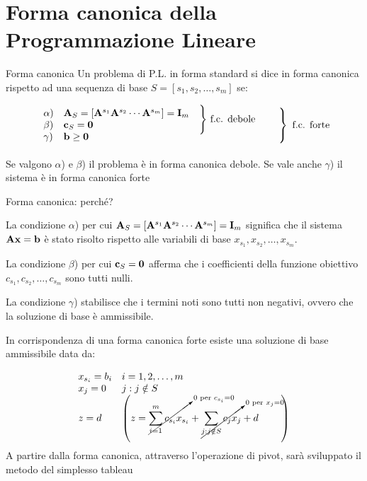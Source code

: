 \documentclass{beamer}
\begin{document}
\section{Forma canonica della Programmazione Lineare}

\begin{frame}{Forma canonica}
Un problema di P.L. in forma standard si dice in forma canonica rispetto ad una sequenza di base  $S = [s_1, s_2, \ldots, s_m]$ se:


\[\begin{array}{ll}
\alpha) & \mathbf{A}_S = [\mathbf{A}^{s_1} \mathbf{A}^{s_2} \cdots \mathbf{A}^{s_m}] = \mathbf{I}_m \\
\beta) & \mathbf{c}_S = \mathbf{0} \\
\gamma) & \mathbf{b} \geq \mathbf{0}
\end{array}
\begin{array}{ll}
\Bigg\} \text{ f.c. debole}\\
\phantom{x}
\end{array}
\left.\begin{array}{ll}
\phantom{x}\\
\phantom{x}\\
\phantom{x}\\
\end{array}
\right\rbrace \text{ f.c. forte}
\]

Se valgono $\alpha$) e $\beta$) il problema \`e in forma canonica debole. Se vale anche $\gamma$) il sistema \`e in forma canonica forte
\end{frame}


\begin{frame}[allowframebreaks]{Forma canonica: perch\'e?}

La condizione $\alpha$)  per cui $\mathbf{A}_S = [\mathbf{A}^{s_1} \mathbf{A}^{s_2} \cdots \mathbf{A}^{s_m}] = \mathbf{I}_m$  significa che il sistema $\mathbf{A}\mathbf{x} = \mathbf{b}$ \`e stato risolto rispetto alle variabili di base $x_{s_1}, x_{s_2}, \ldots, x_{s_m}$.
  

   La condizione $\beta$) per cui $\mathbf{c}_S = \mathbf{0}$ afferma che i coefficienti della funzione obiettivo $c_{s_1}, c_{s_2}, \ldots, c_{s_m}$ sono tutti nulli.

  La condizione $\gamma$) stabilisce che i termini noti sono tutti non negativi, ovvero che la soluzione di base \`e ammissibile.

\framebreak

{\footnotesize In corrispondenza di una forma canonica forte esiste una soluzione di base ammissibile data da: }

\small$$
\begin{array}{ll}
  x_{s_i} = b_i	& i=1,2,\ldots,m \\
  x_j = 0			&  j : j \notin S \\
  z = d				& \left( z= 
  \cancelto{0 \text{ per } c_{s_i }=0}{\displaystyle \sum_{i=1}^{m} c_{s_i} x_{s_i}} +
  \cancelto{0 \text{ per } x_j = 0}{\displaystyle \sum_{j:j\notin S} c_j x_j}
  +d \hspace*{0.8cm}
   \right)
\end{array}
$$
{\footnotesize A partire dalla forma canonica, attraverso l'operazione di pivot, sar\`a sviluppato il metodo del simplesso tableau}
\end{frame}
\end{document}
